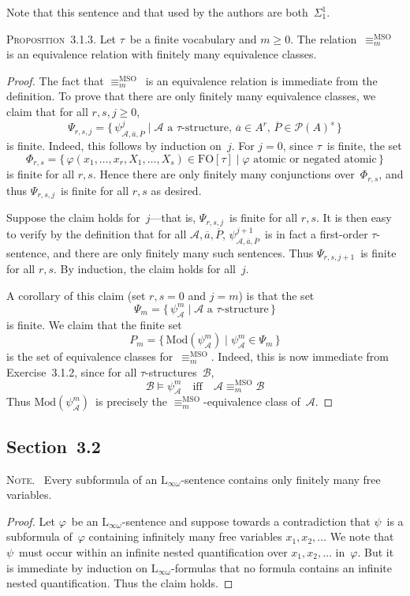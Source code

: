 \documentclass[letterpaper]{article}
\newcommand{\A}{\mathcal{A}}
\newcommand{\B}{\mathcal{B}}
\newcommand{\ps}{\mathcal{P}}
\newcommand{\fo}{\mathrm{FO}}
\newcommand{\mso}{\mathrm{MSO}}
\renewcommand{\L}{\mathrm{L}}
\newcommand{\Lio}{\L_{\infty\omega}}
\newcommand{\mods}{\mathrm{Mod}}
\newcommand{\obar}[1]{\overline{#1}}
\newcommand{\msoequiv}{\equiv^{\mso}}
\newcommand{\booksection}[1]{\subsection*{Section~{#1}}}
\newcommand{\proposition}[1]{\noindent\textsc{Proposition~{#1}.}}
\newcommand{\note}{\noindent\textsc{Note.}\ }
\theoremstyle{plain}
\begin{document}
\noindent Note that this sentence and that used by the authors are both~$\Sigma_1^1$.

\bigskip
\proposition{3.1.3}
Let $\tau$~be a finite vocabulary and $m\ge0$. The relation~$\msoequiv_m$ is an equivalence relation with finitely many equivalence classes.
\begin{proof}
The fact that $\msoequiv_m$~is an equivalence relation is immediate from the definition. To prove that there are only finitely many equivalence classes, we claim that for all $r,s,j\ge0$,
$$\Psi_{r,s,j}=\{\,\psi_{\A,\obar{a},\obar{P}}^j\mid\text{$\A$~a $\tau$-structure, $\obar{a}\in A^r$, $\obar{P}\in\ps(A)^s$}\,\}$$
is finite. Indeed, this follows by induction on~$j$. For $j=0$, since $\tau$~is finite, the set
$$\Phi_{r,s}=\{\,\varphi(x_1,\ldots,x_r,X_1,\ldots,X_s)\in\fo[\tau]\mid\text{$\varphi$~atomic or negated atomic}\,\}$$
is finite for all $r,s$. Hence there are only finitely many conjunctions over~$\Phi_{r,s}$, and thus $\Psi_{r,s,j}$~is finite for all $r,s$ as desired.

Suppose the claim holds for~$j$---that is, $\Psi_{r,s,j}$~is finite for all $r,s$. It is then easy to verify by the definition that for all $\A,\obar{a},\obar{P}$, $\psi_{\A,\obar{a},\obar{P}}^{j+1}$~is in fact a first-order $\tau$-sentence, and there are only finitely many such sentences. Thus $\Psi_{r,s,j+1}$~is finite for all $r,s$. By induction, the claim holds for all~$j$.

A corollary of this claim (set $r,s=0$ and $j=m$) is that the set
$$\Psi_m=\{\,\psi_{\A}^m\mid\text{$\A$~a $\tau$-structure}\,\}$$
is finite. We claim that the finite set
$$P_m=\{\,\mods(\psi_{\A}^m)\mid \psi_{\A}^m\in\Psi_m\,\}$$
is the set of equivalence classes for~$\msoequiv_m$. Indeed, this is now immediate from Exercise~3.1.2, since for all $\tau$-structures~$\B$,
$$\B\models\psi_{\A}^m\quad\text{iff}\quad\A\msoequiv_m\B$$
Thus $\mods(\psi_{\A}^m)$~is precisely the $\msoequiv_m$-equivalence class of~$\A$.
\end{proof}

\booksection{3.2}
\note
Every subformula of an $\Lio$-sentence contains only finitely many free variables.
\begin{proof}
Let $\varphi$~be an $\Lio$-sentence and suppose towards a contradiction that $\psi$~is a subformula of~$\varphi$ containing infinitely many free variables $x_1,x_2,\ldots$ We note that $\psi$~must occur within an infinite nested quantification over $x_1,x_2,\ldots$ in~$\varphi$. But it is immediate by induction on $\Lio$-formulas that no formula contains an infinite nested quantification. Thus the claim holds.
\end{proof}
\end{document}
